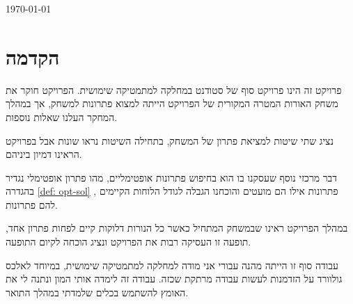 \documentclass[12pt,leqno]{article}
\theoremstyle{theoremdd}
\begin{document}
\begin{titlepage}

{\large \today} \\[2cm] %


\vfill %

\end{titlepage}
\tableofcontents

\newpage
\section{הקדמה}
פרויקט זה הינו פרויקט סוף של סטודנט במחלקה למתמטיקה שימושית.
הפרויקט 
חוקר את משחק האורות 
המטרה המקורית של הפרויקט הייתה למצוא פתרונות למשחק, אך במהלך המחקר
העלנו שאלות נוספות.

נציג שתי שיטות למציאת פתרון של המשחק,
בתחילה השיטות נראו שונות אבל בפרויקט הראינו דמיון ביניהם.

דבר מרכזי נוסף שעסקנו בו הוא בחיפוש פתרונות אופטימליים,
מהו פתרון אופטימלי נגדיר בהגדרה
\ref{def: opt-sol}
,
פתרונות אילו הם מועטים והוכחנו הגבלה לגודל הלוחות הקיימים להם פתרונות.

במהלך הפרויקט ראינו שבמשחק המתחיל כאשר כל הנורות דלוקות קיים לפחות פתרון אחד,
תופעה זו העסיקה רבות את הפרויקט ונציג הוכחה
לקיום התופעה.

עבודה סוף זו הייתה מהנה עבורי אני מודה למחלקה
למתמטיקה שימושית,
במיוחד לאלכס גולוורד על הזדמנות לעשות 
עבודה מרתקת שכזה.
עבודה זה לימדה אותי המון ונתנה לי את האומץ להשתמש בכלים שלמדתי במהלך התואר.
\newpage
\end{document}
